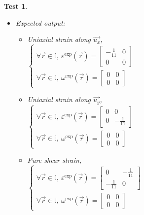 \documentclass[12pt, titlepage]{article}
\newtheorem{Test}{Test}
\begin{document}
\begin{Test}
\begin{itemize}
\begin{itemize}
\end{itemize} 
\item Expected output:
	\begin{itemize}
	\item Uniaxial strain along $\vec{u_x}$,\\
	\newline
	$\begin{cases} 
	\forall \vec{r} \in \mathbb{I}, \ \varepsilon^{\text{exp}}(\vec{r}) = \begin{bmatrix}
	-\frac{1}{11} & 0 \\
	0 & 0
	\end{bmatrix}  \\
	\forall \vec{r} \in \mathbb{I}, \  \omega^{\text{exp}}(\vec{r}) = \begin{bmatrix}
	0 & 0 \\
	0 & 0 
	\end{bmatrix} 
	\end{cases}$
	\item Uniaxial strain along $\vec{u_y}$,\\
	\newline
	$\begin{cases} 
	\forall \vec{r} \in \mathbb{I}, \ \varepsilon^{\text{exp}}(\vec{r}) = \begin{bmatrix}
	0 & 0 \\
	0 & -\frac{1}{11}
	\end{bmatrix}  \\
	\forall \vec{r} \in \mathbb{I}, \  \omega^{\text{exp}}(\vec{r}) = \begin{bmatrix}
	0 & 0 \\
	0 & 0 
	\end{bmatrix} 
	\end{cases}$
	\item Pure shear strain,\\
	\newline
	$\begin{cases} 
	\forall \vec{r} \in \mathbb{I}, \ \varepsilon^{\text{exp}}(\vec{r}) = \begin{bmatrix}
	0 & -\frac{1}{11} \\
	-\frac{1}{11} & 0
	\end{bmatrix}  \\
	\forall \vec{r} \in \mathbb{I}, \  \omega^{\text{exp}}(\vec{r}) = \begin{bmatrix}
	0 & 0 \\
	0 & 0 
	\end{bmatrix} 
	\end{cases}$

\end{itemize}
\end{itemize}
\end{Test}
\end{document}
